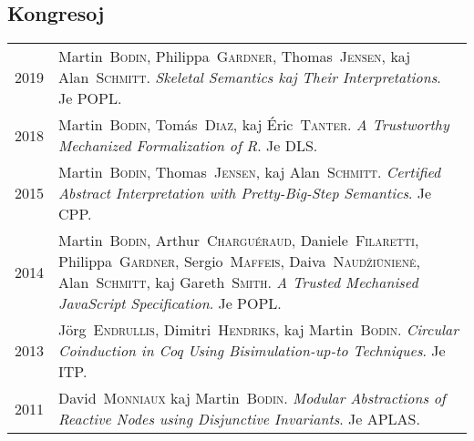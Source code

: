 \documentclass[12pt,a4paper]{article}
\makeatletter
\newenvironment{datecvsection}[1]%
               {\subsection*{#1}%
                 \noindent \begin{tabular}{@{}p{\annee}p{\texte}@{}}}
               {\end{tabular}}
\newcommand\familyName{\textsc}
\makeatother
\begin{document}
\begin{datecvsection}{Kongresoj}

  2019 & Martin~\familyName{Bodin}, Philippa~\familyName{Gardner}, Thomas~\familyName{Jensen}, kaj Alan~\familyName{Schmitt}. \textit{Skeletal Semantics kaj Their Interpretations}. Je POPL. \\

  2018 & Martin~\familyName{Bodin}, Tomás~\familyName{Diaz}, kaj Éric~\familyName{Tanter}. \textit{A Trustworthy Mechanized Formalization of R}. Je DLS. \\

  2015 & Martin~\familyName{Bodin}, Thomas~\familyName{Jensen}, kaj Alan~\familyName{Schmitt}. \textit{Certified Abstract Interpretation with Pretty-Big-Step Semantics}. Je CPP. \\

  2014 & Martin~\familyName{Bodin}, Arthur~\familyName{Charguéraud}, Daniele~\familyName{Filaretti}, Philippa~\familyName{Gardner}, Sergio~\familyName{Maffeis}, Daiva~\familyName{Naudžiūnienė}, Alan~\familyName{Schmitt}, kaj Gareth~\familyName{Smith}. \textit{A Trusted Mechanised JavaScript Specification}. Je POPL. \\

  2013 & Jörg~\familyName{Endrullis}, Dimitri~\familyName{Hendriks}, kaj Martin~\familyName{Bodin}. \textit{Circular Coinduction in Coq Using Bisimulation-up-to Techniques}. Je ITP. \\

  2011 & David~\familyName{Monniaux} kaj Martin~\familyName{Bodin}. \textit{Modular Abstractions of Reactive Nodes using Disjunctive Invariants}. Je APLAS. \\

\end{datecvsection}
\end{document}
